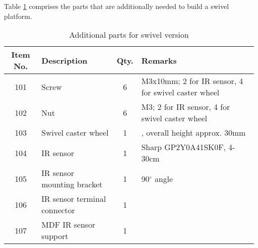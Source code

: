 \documentclass[10pt,a4paper]{article}
\begin{document}
\newpage
\noindent Table \ref{parts_swivel} comprises the parts that are additionally needed to build a swivel platform.
\begin{table}[H]
 \centering
 \begin{tabular}{| c | l | c | l|}
  \hline
  Item No. & Description                  & Qty. & Remarks                                                           \\ \hline
  101      & Screw                        & 6    & \footnotesize M3x10mm; 2 for IR sensor, 4 for swivel caster wheel \\ \hline
  102      & Nut                          & 6    & \footnotesize M3; 2 for IR sensor, 4 for swivel caster wheel      \\ \hline
  103      & Swivel caster wheel          & 1    & \footnotesize \diameter25mm, overall height approx. 30mm          \\ \hline
  104      & IR sensor                    & 1    & \footnotesize Sharp GP2Y0A41SK0F, 4-30cm                          \\ \hline
  105      & IR sensor mounting bracket   & 1    & \footnotesize 90$^\circ$ angle                                    \\ \hline
  106      & IR sensor terminal connector & 1    &                                                                   \\ \hline
  107      & MDF IR sensor support        & 1    &                                                                   \\ \hline
 \end{tabular}
 \caption{Additional parts for swivel version}\label{parts_swivel}
\end{table}
\end{document}
